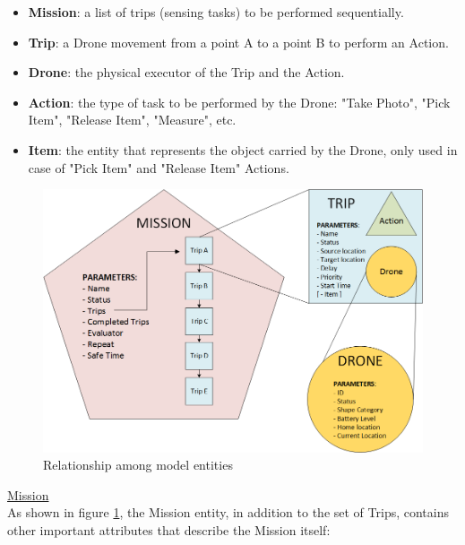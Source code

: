 \begin{itemize}
\itemsep2pt
\item{
\textbf{Mission}: a list of trips (sensing tasks) to be performed sequentially.
}
\item{
\textbf{Trip}: a Drone movement from a point A to a point B to perform an Action.
}
\item{
\textbf{Drone}: the physical executor of the Trip and the Action.
}
\item{
\textbf{Action}: the type of task to be performed by the Drone: "Take Photo", "Pick Item", "Release Item", "Measure", etc.
}
\item{
\textbf{Item}: the entity that represents the object carried by the Drone, only used in case of "Pick Item" and "Release Item" Actions.
}
\end{itemize}

\begin{figure}[h!]
  \centering
  \includegraphics[width=\linewidth]
  {pictures/EntityRelationship.png}
  \caption{Relationship among model entities}
  \label{fig:EntityRelationship}
\end{figure}

\underline{Mission}
\\

As shown in figure \ref{fig:EntityRelationship}, the Mission entity, in addition to the set of Trips, contains other important attributes that describe the Mission itself:


